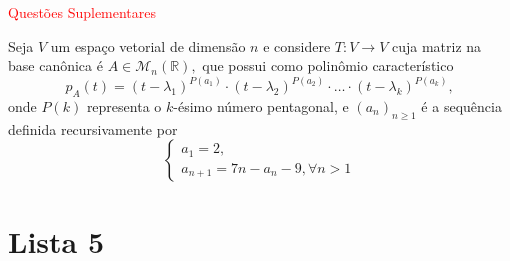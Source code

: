 \documentclass[11pt,a4paper]{article}
\begin{document}
\bigskip
\noindent
\textcolor{Red}{Questões Suplementares}

 Seja $V$ um espaço vetorial de dimensão $n$ e considere $T \colon V \to V$ cuja matriz na base canônica é $A \in \mathcal{M}_n(\mathbb{R}),$ que possui como polinômio característico
\[
p_A(t) = (t - \lambda_1)^{P(a_1)} \cdot (t - \lambda_2)^{P(a_2)} \cdot \ldots \cdot (t - \lambda_k)^{P(a_k)},
\]
onde $P(k)$ representa o $k$-ésimo número pentagonal, e $(a_n)_{n \ge 1}$ é a sequência definida recursivamente por
\[\begin{cases}
a_1 = 2,\\
a_{n+1} = 7n - a_{n} - 9, \forall n > 1
\end{cases}\]
\solucao{}
\newpage
\section{\textcolor{Floresta}{Lista 5}}
\end{document}
